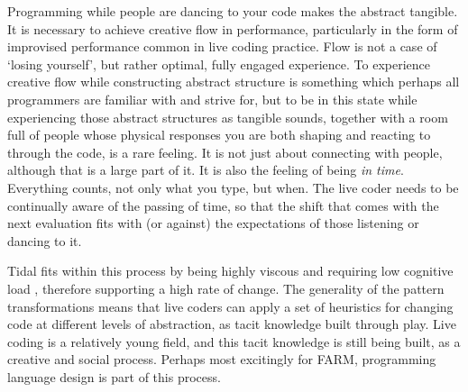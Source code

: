\documentclass[authoryear,preprint]{sigplanconf}
\begin{document}
Programming while people are dancing to your code makes the abstract
tangible. It is necessary to achieve creative flow in performance,
particularly in the form of improvised performance common in live
coding practice. Flow is not a case of `losing yourself', but rather
optimal, fully engaged experience. To experience creative flow while
constructing abstract structure is something which perhaps all
programmers are familiar with and strive for, but to be in this state
while experiencing those abstract structures as tangible sounds,
together with a room full of people whose physical responses you are
both shaping and reacting to through the code, is a rare feeling. It
is not just about connecting with people, although that is a large
part of it. It is also the feeling of being \emph{in time}. Everything
counts, not only what you type, but when. The live coder needs to be
continually aware of the passing of time, so that the shift that comes
with the next evaluation fits with (or against) the expectations of
those listening or dancing to it.

Tidal fits within this process by being highly viscous and requiring
low cognitive load \citet{Green00}, therefore supporting a high rate
of change. The generality of the pattern transformations means that
live coders can apply a set of heuristics for changing code at
different levels of abstraction, as tacit knowledge built through
play. Live coding is a relatively young field, and this tacit
knowledge is still being built, as a creative and social
process. Perhaps most excitingly for FARM, programming language design
is part of this process.





\end{document}
